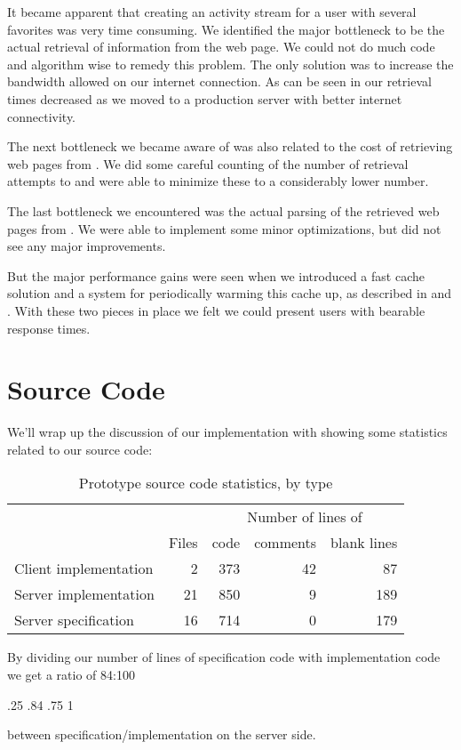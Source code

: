 It became apparent that creating an activity stream for a user with several
favorites was very time consuming. We identified the major bottleneck to be
the actual retrieval of information from the \urort{} web page. We could not
do much code and algorithm wise to remedy this problem. The only solution
was to increase the bandwidth allowed on our internet connection.
As can be seen in
our retrieval times decreased as we moved to a production server with
better internet connectivity.

The next bottleneck we became aware of was also related to the cost of
retrieving web pages from \urort{}. We did some careful counting of the number
of retrieval attempts to \urort{} and were able to minimize these to a
considerably lower number.

The last bottleneck we encountered was the actual parsing of the retrieved web
pages from \urort{}. We were able to implement some minor optimizations, but
did not see any major improvements.

But the major performance gains were seen when we introduced a fast cache
solution and a system for periodically warming this cache up,
as described in
 and
.
With these two pieces in place we felt we could present users with bearable
response times.

\section{Source Code}
\label{section:implementation.source.code}

We'll wrap up the discussion of our implementation with showing some
statistics related to our source code:

\begin{table}[h]
  \begin{tabular}{lrrrr}

    &
    &
    \multicolumn{3}{c}{Number of lines of} \\

    &
    \multicolumn{1}{c}{Files} &
    \multicolumn{1}{c}{code} &
    \multicolumn{1}{c}{comments} &
    \multicolumn{1}{c}{blank lines} \\

    \cmidrule(lr){2-2}
    \cmidrule(lr){3-5}

    Client implementation &
    2 &
    373 &
    42 &
    87 \\

    Server implementation &
    21 &
    850 &
    9 &
    189 \\

    Server specification &
    16 &
    714 &
    0 &
    179 \\

  \end{tabular}
  \caption[Prototype Source Code Statistics]{%
    Prototype source code statistics, by type}
  \label{table:prototype.source.code.stats}
\end{table}

By dividing our number of lines of specification code with implementation code
we get a ratio of 84:100
\begin{sparkline}{3}
  \sparkspike .25  .84
  \sparkspike .75  1
\end{sparkline}
between specification/implementation on the server side.
